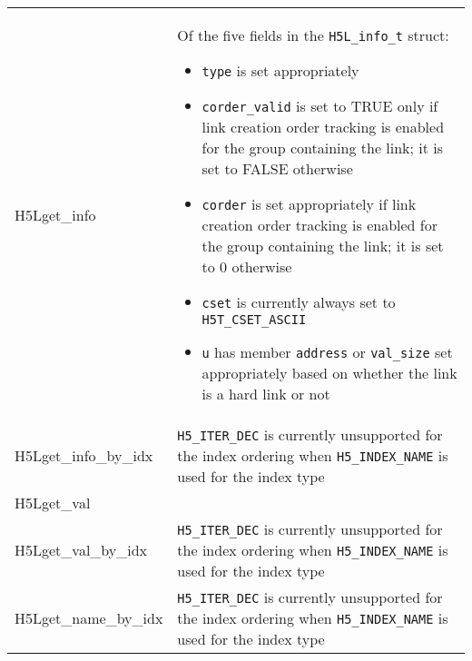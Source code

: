 \documentclass[../users_guide.tex]{subfiles}
\begin{document}
\begin{center}

\begin{tabularx}{\linewidth}{| X | >{\RaggedRight}X |}
\hline
\rowcolor{lightgray!50}%
\multicolumn{1}{| c |}{\textbf{API call}} & \multicolumn{1}{c |}{\textbf{Notes}} \\ \hline

H5Lget\_info & Of the five fields in the \texttt{H5L\_info\_t} struct:
                                     \begin{itemize}
                                         \item \texttt{type} is set appropriately
                                         \item \texttt{corder\_valid} is set to TRUE only if link creation order tracking is enabled for the group containing the link; it is set to FALSE otherwise
                                         \item \texttt{corder} is set appropriately if link creation order tracking is enabled for the group containing the link; it is set to 0 otherwise
                                         \item \texttt{cset} is currently always set to \texttt{H5T\_CSET\_ASCII}
                                         \item \texttt{u} has member \texttt{address} or \texttt{val\_size} set appropriately based on whether the link is a hard link or not
                                     \end{itemize}\\ \hline
H5Lget\_info\_by\_idx & \texttt{H5\_ITER\_DEC} is currently unsupported for the index ordering when \texttt{H5\_INDEX\_NAME} is used for the index type\\ \hline
H5Lget\_val & \\ \hline
H5Lget\_val\_by\_idx & \texttt{H5\_ITER\_DEC} is currently unsupported for the index ordering when \texttt{H5\_INDEX\_NAME} is used for the index type\\ \hline
H5Lget\_name\_by\_idx & \texttt{H5\_ITER\_DEC} is currently unsupported for the index ordering when \texttt{H5\_INDEX\_NAME} is used for the index type\\ \hline

\end{tabularx}

\newpage

\begin{tabularx}{\linewidth}{| X | >{\RaggedRight}X |}
\hline
\rowcolor{lightgray!50}%
\multicolumn{1}{| c |}{\textbf{API call}} & \multicolumn{1}{c |}{\textbf{Notes}} \\ \hline


\end{tabularx}
\end{center}
\end{document}

